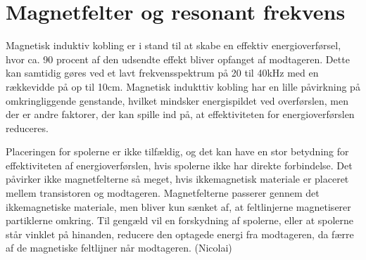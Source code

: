 \section{Magnetfelter og resonant frekvens}

Magnetisk induktiv kobling er i stand til at skabe en effektiv energioverførsel, hvor ca. 90 procent af den udsendte effekt bliver opfanget af modtageren. Dette kan samtidig gøres ved et lavt frekvensspektrum på 20 til 40kHz med en rækkevidde på op til 10cm. Magnetisk indukttiv kobling har en lille påvirkning på omkringliggende genstande, hvilket mindsker energispildet ved overførslen, men der er andre faktorer, der kan spille ind på, at effektiviteten for energioverførslen reduceres.

Placeringen for spolerne er ikke tilfældig, og det kan have en stor betydning for effektiviteten af energioverførslen, hvis spolerne ikke har direkte forbindelse. Det påvirker ikke magnetfelterne så meget, hvis ikkemagnetisk materiale er placeret mellem transistoren og modtageren. Magnetfelterne passerer gennem det ikkemagnetiske materiale, men bliver kun sænket af, at feltlinjerne magnetiserer partiklerne omkring. Til gengæld vil en forskydning af spolerne, eller at spolerne står vinklet på hinanden, reducere den optagede energi fra modtageren, da færre af de magnetiske feltlijner når modtageren. (Nicolai)

